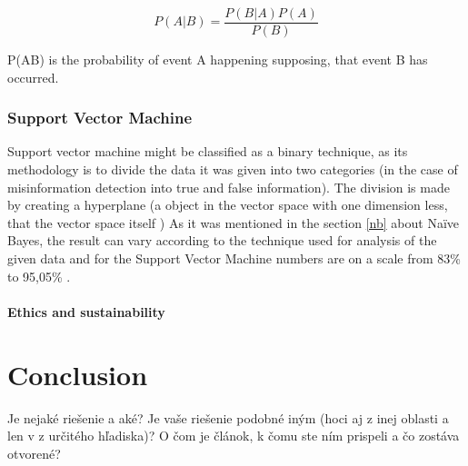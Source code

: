 \documentclass[11pt ,english,a4paper]{article}
\begin{document}
\begin{equation}
P(A|B) = \frac{P(B|A)P(A)}{P(B)}
\end{equation}

P(A\textbar B) is the probability of event A happening supposing, that event B has occurred.

\subsubsection{Support Vector Machine}\label{svm}
Support vector machine might be classified as a binary technique, as its methodology is to divide the data it was given into two categories \cite{pod19mach} (in the case of misinformation detection into true and false information). The division is made by creating a hyperplane (a object in the vector space with one dimension less, that the vector space itself \cite{sha20mach})
As it was mentioned in the section \ref{nb} about Naïve Bayes, the result can vary according to the technique used for analysis of the given data and for the Support Vector Machine numbers are on a scale from 83\% \cite{chap22unmask} to 95,05\% \cite{sha20mach}.

\paragraph{Ethics and sustainability}%

\section{Conclusion}\label{conclusion}

Je nejaké riešenie a aké?
Je vaše riešenie podobné iným (hoci aj z inej oblasti a len v z určitého hľadiska)?
O čom je článok, k čomu ste ním prispeli a čo zostáva otvorené?


\newpage

\end{document}
